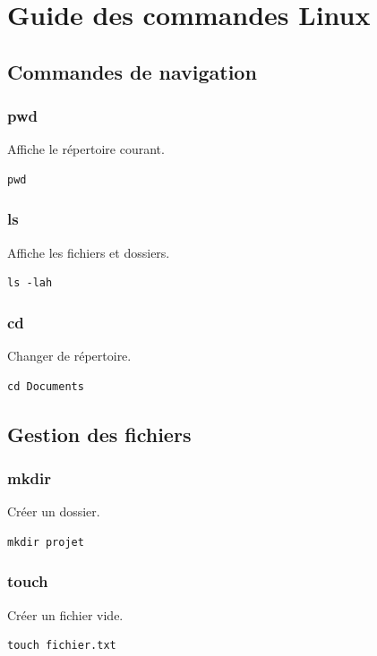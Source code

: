 \documentclass[12pt,a4paper]{report}
\begin{document}
\chapter{Guide des commandes Linux}

\section{Commandes de navigation}

\subsection*{pwd}
Affiche le répertoire courant.

\begin{lstlisting}
pwd
\end{lstlisting}

\subsection*{ls}
Affiche les fichiers et dossiers.

\begin{lstlisting}
ls -lah
\end{lstlisting}

\subsection*{cd}
Changer de répertoire.

\begin{lstlisting}
cd Documents
\end{lstlisting}

\section{Gestion des fichiers}

\subsection*{mkdir}
Créer un dossier.

\begin{lstlisting}
mkdir projet
\end{lstlisting}

\subsection*{touch}
Créer un fichier vide.

\begin{lstlisting}
touch fichier.txt
\end{lstlisting}
\end{document}
